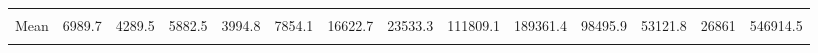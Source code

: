\begin{longtable}[t]{crrrrrrrrrrrrr}
\midrule
\cellcolor{red}{Max} & \cellcolor{red}{19785.2} & \cellcolor{red}{11543.1} & \cellcolor{red}{18363.4} & \cellcolor{red}{5740.4} & \cellcolor{red}{12694.7} & \cellcolor{red}{40280.5} & \cellcolor{red}{32954.1} & \cellcolor{red}{237966.4} & \cellcolor{red}{475231.4} & \cellcolor{red}{196640.6} & \cellcolor{red}{135278.1} & \cellcolor{red}{96594.6} & \cellcolor{red}{1109475}\\
Mean & 6989.7 & 4289.5 & 5882.5 & 3994.8 & 7854.1 & 16622.7 & 23533.3 & 111809.1 & 189361.4 & 98495.9 & 53121.8 & 26861 & 546914.5\\
\cellcolor{green}{Min} & \cellcolor{green}{276.8} & \cellcolor{green}{899.7} & \cellcolor{green}{-892.1} & \cellcolor{green}{3171.5} & \cellcolor{green}{3940.3} & \cellcolor{green}{6655.5} & \cellcolor{green}{17644.4} & \cellcolor{green}{21995.4} & \cellcolor{green}{33348.3} & \cellcolor{green}{30169.7} & \cellcolor{green}{5718.7} & \cellcolor{green}{-7152.8} & \cellcolor{green}{210798.5}\\*
\end{longtable}
